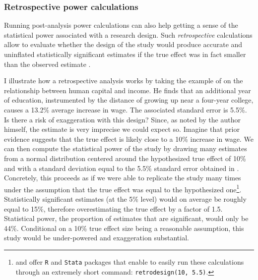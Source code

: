 \documentclass[usletter, 12pt]{article}
\begin{document}
				
			\subsubsection{Retrospective power calculations}
			
				Running post-analysis power calculations can also help getting a sense of the statistical power associated with a research design. Such \textit{retrospective} calculations allow to evaluate whether the design of the study would produce accurate and uninflated statistically significant estimates if the true effect was in fact smaller than the observed estimate \citep{gelman_beyond_2014, ioannidis_power_2017, stommes_reliability_2021}. 
				
				I illustrate how a retrospective analysis works by taking the example of \cite{card_using_1993} on the relationship between human capital and income. He finds that an additional year of education, instrumented by the distance of growing up near a four-year college, causes a 13.2\% average increase in wage. The associated standard error is 5.5\%. Is there a risk of exaggeration with this design? Since, as noted by the author himself, the estimate is very imprecise we could expect so. Imagine that prior evidence suggests that the true effect is likely close to a 10\% increase in wage. We can then compute the statistical power of the study by drawing many estimates from a normal distribution centered around the hypothesized true effect of 10\% and with a standard deviation equal to the 5.5\% standard error obtained in \cite{card_using_1993}. Concretely, this proceeds as if we were able to replicate the study many times under the assumption that the true effect was equal to the hypothesized one\footnote{\cite{timm_retrodesign_2019} and \cite{linden_retrodesign_2019} offer \texttt{R} and \texttt{Stata} packages that enable to easily run these calculations through an extremely short command: \texttt{retrodesign(10, 5.5)}.}. Statistically significant estimates (at the 5\% level) would on average be roughly equal to 15\%, therefore overestimating the true effect by a factor of 1.5. Statistical power, the proportion of estimates that are significant, would only be 44\%. Conditional on a 10\% true effect size being a reasonable assumption, this study would be under-powered and exaggeration substantial.
			
\end{document}
